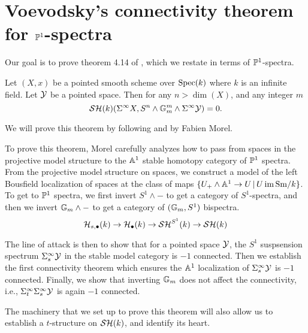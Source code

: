 \documentclass{amsart}%
\begin{document}
\section{Voevodsky's connectivity theorem for $\mathbb{P}^1$-spectra}

Our goal is to prove theorem 4.14 of \cite{Voev98}, which we restate
in terms of $\mathbb{P}^1$-spectra. 

\begin{theorem}
  \label{Voev}
  Let $(X,x)$ be a pointed smooth scheme over $\operatorname{Spec}(k)$ where $k$ is
  an infinite field. Let $\mathcal{Y}$ be a pointed space. Then for any
  $n > \dim(X)$, and any integer $m$
  \begin{equation*}
    \mathcal{SH}(k)(\Sigma^{\infty}X, S^n\wedge \mathbb{G}_m^m \wedge \Sigma^{\infty} \mathcal{Y}) = 0.
  \end{equation*}
\end{theorem}

We will prove this theorem by following \cite{Mor03} and \cite{Mor05}
by Fabien Morel.

\begin{remark}
  To prove this theorem, Morel carefully analyzes how to pass from
  spaces in the projective model structure to the $\mathbb{A}^1$ stable
  homotopy category of $\mathbb{P}^1$ spectra. From the projective model
  structure on spaces, we construct a model of the left Bousfield
  localization of spaces at the class of maps
  $\{ U_+ \wedge \mathbb{A}^1 \to U \, \vert \, U \operatorname{im} \mathrm{Sm}/k\}$. To get to $\mathbb{P}^1$
  spectra, we first invert $S^1 \wedge -$ to get a category of
  $S^1$-spectra, and then we invert $\mathbb{G}_m \wedge -$ to get a
  category of $(\mathbb{G}_m, S^1)$ bispectra.
  \begin{equation*}
    \mathcal{H}_{s,\bullet}(k) \to \mathcal{H}_{\bullet}(k) \to \mathcal{SH}^{S^1}(k) \to \mathcal{SH}(k)
  \end{equation*}

  The line of attack is then to show that for a pointed space $\mathcal{Y}$,
  the $S^1$ suspsension spectrum $\Sigma^{\infty}_s \mathcal{Y}$ in the
  stable model category is $-1$ connected. Then we establish the first
  connectivity theorem which ensures the $\mathbb{A}^1$ localization of
  $\Sigma^{\infty}_s\mathcal{Y}$ is $-1$ connected. Finally, we show that
  inverting $\mathbb{G}_m$ does not affect the connectivity, i.e.,
  $\Sigma^{\infty}_{t}\Sigma^{\infty}_s \mathcal{Y}$ is again $-1$
  connected.

  The machinery that we set up to prove this theorem will also allow
  us to establish a $t$-structure on $\mathcal{SH}(k)$, and identify its heart.
\end{remark}
\end{document}
